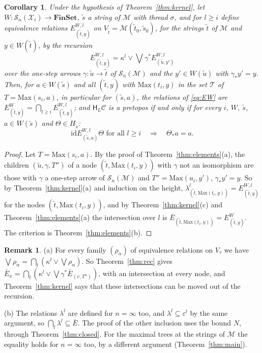 \documentclass[11pt]{amsart}
\newtheorem{cor}[thm]{Corollary}
\theoremstyle{definition}
\newtheorem{rem}[thm]{Remark}
\newcommand{\Fin}{\mathbf{FinSet}}
\newcommand{\Max}{\mathrm{Max}}
\newcommand{\HH}{\mathsf H}
\newcommand{\cX}{\mathcal X}
\newcommand{\cC}{\mathcal C}
\newcommand{\cM}{\mathcal M}
\newcommand{\cS}{\mathcal S}
\newcommand{\id}{\mathrm{id}}
\begin{document}
\begin{cor}\label{cor:elements}
Under the hypothesis of Theorem~\ref{thm:kernel}, let $W\colon\cS_n
(\cX_i)\to\Fin$, $\tilde s$ a string of $\cM$ with thread $\sigma$,
and for $l\ge i$ define equivalence relations $E^{W,l}_{(\tilde
t,y)}$ on $V_{\tilde t}=\cM(\tilde t_0,\tilde s_0)$, for the strings
$\tilde t$ of $\cM$ and $y\in W(\tilde t)$, by the recursion
\[
E^{W,l}_{(\tilde t,y)}=\kappa^l\vee\bigvee\gamma^*E^{W,l}_{(\tilde
u,y')}
\]
over the one-step arrows $\gamma\colon\tilde u\to\tilde t$ of
$\cS_n(\cM)$ and the $y'\in W(\tilde u)$ with $\gamma_*y'=y$. Then, for $a\in W(\tilde s)$ and all $(\tilde t,y)$ with
$\Max(t_i,y)$ in the set $\mathcal T$ of $T=\Max(s_i,a)$, in particular for
$(\tilde s,a)$, the relations of \eqref{eq:EW} are $E^W_{(\tilde
t,y)}=\bigcap_{l\ge i}E^{W,l}_{(\tilde t,y)}$; and $\HH_L\cC$ is a pretopos if and only
if for every $i$, $W$, $\tilde s$, $a\in W(\tilde s)$ and $\Theta\in
H_{\tilde s}$:
\[
\id\mathrel{E^{W,l}_{(\tilde s,a)}}\Theta\text{ for all }l\ge i
\quad\Longrightarrow\quad\Theta_*a=a.
\]
\end{cor}
\begin{proof}
Let $T=\Max(s_i,a)$. By the proof of Theorem~\ref{thm:elements}(a), the children
$(\tilde u,\gamma,T'')$ of a node $(\tilde t,\Max(t_i,y))$ with
$\gamma$ not an isomorphism are those with $\gamma$ a one-step arrow
of $\cS_n(\cM)$ and $T''=\Max(u_i,y')$, $\gamma_*y'=y$. So by
Theorem~\ref{thm:kernel}(a) and induction on the height,
$\lambda^l_{(\tilde t,\Max(t_i,y))}=E^{W,l}_{(\tilde t,y)}$ for the
nodes $(\tilde t,\Max(t_i,y))$, and by
Theorem~\ref{thm:kernel}(c) and Theorem~\ref{thm:elements}(a) the intersection over
$l$ is $\bar E_{(\tilde t,\Max(t_i,y))}=E^W_{(\tilde t,y)}$. The
criterion is Theorem~\ref{thm:elements}(b).
\end{proof}

\begin{rem}\label{rem:meaning}
(a) For every family $(\rho_\alpha)$ of equivalence relations on
$V_\tau$ we have $\widehat\bigvee\rho_\alpha=\bigcap_l(\kappa^l\vee
\bigvee\rho_\alpha)$. So Theorem~\ref{thm:rec} gives $\bar E_x=
\bigcap_l(\kappa^l\vee\bigvee\gamma^*\bar E_{(\upsilon,T'')})$, with
an intersection at every node, and Theorem~\ref{thm:kernel} says that
these intersections can be moved out of the recursion.

(b) The relations $\lambda^l$ are defined for $n=\infty$ too, and
$\lambda^l\subseteq\varepsilon^l$ by the same argument, so
$\bigcap_l\lambda^l\subseteq\bar E$. The proof of the other inclusion
uses the bound $N$, through Theorem~\ref{thm:closed}. For the maximal
trees at the strings of $\cM$ the equality holds for $n=\infty$ too,
by a different argument
(Theorem~\ref{thm:main}).
\end{rem}
\end{document}
